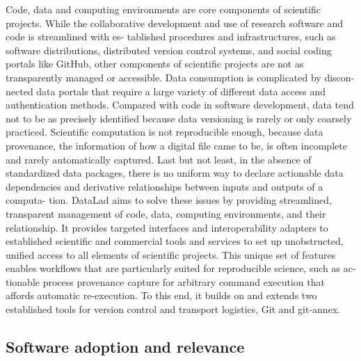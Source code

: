 Code, data and computing environments are core components of scientific projects. While
the collaborative development and use of research software and code is streamlined with es-
tablished procedures and infrastructures, such as software distributions, distributed version
control systems, and social coding portals like GitHub, other components of scientific projects
are not as transparently managed or accessible. Data consumption is complicated by discon-
nected data portals that require a large variety of different data access and authentication
methods. Compared with code in software development, data tend not to be as precisely
identified because data versioning is rarely or only coarsely practiced. Scientific computation
is not reproducible enough, because data provenance, the information of how a digital file
came to be, is often incomplete and rarely automatically captured. Last but not least, in
the absence of standardized data packages, there is no uniform way to declare actionable
data dependencies and derivative relationships between inputs and outputs of a computa-
tion. DataLad aims to solve these issues by providing streamlined, transparent management
of code, data, computing environments, and their relationship. It provides targeted interfaces
and interoperability adapters to established scientific and commercial tools and services to
set up unobstructed, unified access to all elements of scientific projects. This unique set of
features enables workflows that are particularly suited for reproducible science, such as ac-
tionable process provenance capture for arbitrary command execution that affords automatic
re-execution. To this end, it builds on and extends two established tools for version control
and transport logistics, Git and git-annex.


\subsection{Software adoption and relevance}

